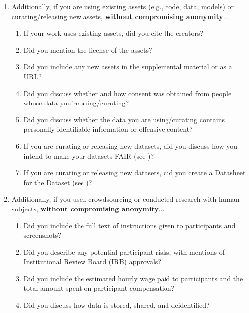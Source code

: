 \begin{enumerate}
\item Additionally, if you are using existing assets (e.g., code, data, models) or curating/releasing new assets, \textbf{without compromising anonymity}...
\begin{enumerate}
  \item If your work uses existing assets, did you cite the creators?
  \item Did you mention the license of the assets?
  \item Did you include any new assets in the supplemental material or as a URL?
  \item Did you discuss whether and how consent was obtained from people whose data you're using/curating?
  \item Did you discuss whether the data you are using/curating contains personally identifiable information or offensive content?
\item If you are curating or releasing new datasets, did you discuss how you intend to make your datasets FAIR (see \citet{fair})?

\item If you are curating or releasing new datasets, did you create a Datasheet for the Dataset (see \citet{gebru2021datasheets})? 

\end{enumerate}

\item Additionally, if you used crowdsourcing or conducted research with human subjects, \textbf{without compromising anonymity}...
\begin{enumerate}
  \item Did you include the full text of instructions given to participants and screenshots?
  \item Did you describe any potential participant risks, with mentions of Institutional Review Board (IRB) approvals?
  \item Did you include the estimated hourly wage paid to participants and the total amount spent on participant compensation?
   \item Did you discuss how data is stored, shared, and deidentified?
\end{enumerate}

\end{enumerate}

